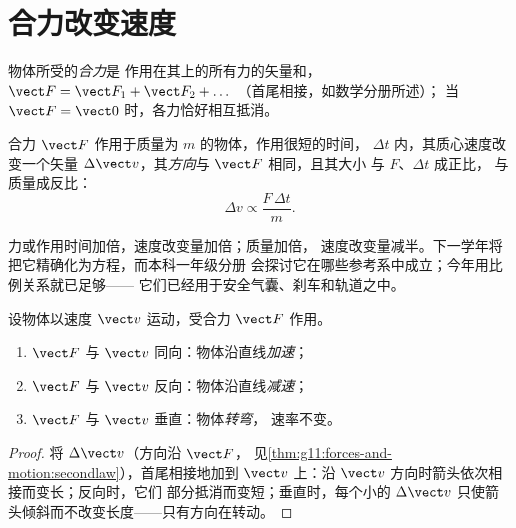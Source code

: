 \section{合力改变速度}

\begin{definition}[合力]\label{def:g11:forces-and-motion:netforce}
物体所受的\emph{合力}是
作用在其上的所有力的矢量和，$\vect F = \vect F_1 + \vect F_2 + \dots$
（首尾相接，如数学分册所述）；
当 $\vect F = \vect 0$ 时，各力恰好相互抵消。
\end{definition}

\begin{theorem}\label{thm:g11:forces-and-motion:secondlaw}
合力 $\vect F$ 作用于质量为 $m$ 的物体，作用很短的时间，
$\Delta t$ 内，其质心速度改变一个矢量
$\Delta \vect v$，其\emph{方向}与 $\vect F$ 相同，且其大小
与 $F$、$\Delta t$ 成正比，
与质量成反比：
\[
\Delta v \propto \frac{F \, \Delta t}{m} .
\]
\end{theorem}
\admitted

\begin{remark}
力或作用时间加倍，速度改变量加倍；质量加倍，
速度改变量减半。下一学年将把它精确化为方程，而本科一年级分册
会探讨它在哪些参考系中成立；今年用比例关系就已足够——
它们已经用于安全气囊、刹车和轨道之中。
\end{remark}

\begin{proposition}[三种典型情形]\label{prop:g11:forces-and-motion:cases}
设物体以速度 $\vect v$ 运动，受合力 $\vect F$ 作用。
\begin{enumerate}
  \item $\vect F$ 与 $\vect v$ 同向：物体沿直线\emph{加速}；
  \item $\vect F$ 与 $\vect v$ 反向：物体沿直线\emph{减速}；
  \item $\vect F$ 与 $\vect v$ 垂直：物体\emph{转弯}，
        速率不变。
\end{enumerate}
\end{proposition}

\begin{proof}
将 $\Delta\vect v$（方向沿 $\vect F$，
见\cref{thm:g11:forces-and-motion:secondlaw}），首尾相接地加到
$\vect v$ 上：沿 $\vect v$ 方向时箭头依次相接而变长；反向时，它们
部分抵消而变短；垂直时，每个小的 $\Delta \vect v$
只使箭头倾斜而不改变长度——只有方向在转动。
\end{proof}

